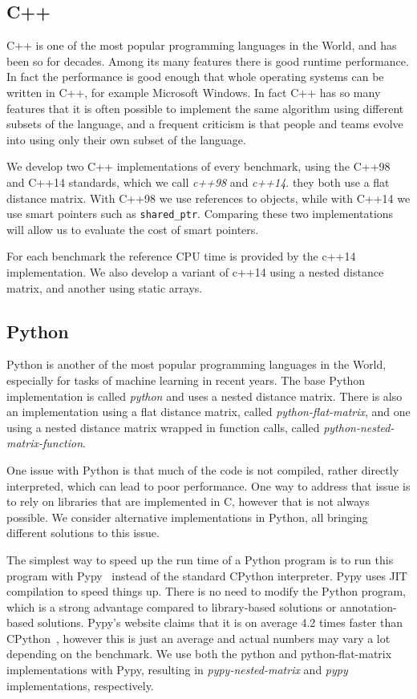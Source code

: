 \documentclass[11pt,a4paper,notitlepage]{article}
\begin{document}
\subsection{C++}
C++ is one of the most popular programming languages in the World, and
has been so for decades. Among its many features there is good
runtime performance. In fact the performance is good enough that whole
operating systems can be written in C++, for example Microsoft
Windows. In fact C++ has so many features that it is often possible to
implement the same algorithm using different subsets of the language,
and a frequent criticism is that people and teams evolve into using
only their own subset of the language.

We develop two C++ implementations of every benchmark, using the C++98
and C++14 standards, which we call \emph{c++98} and \emph{c++14}. they
both use a flat distance matrix. With C++98 we use references to
objects, while with C++14 we use smart pointers such as
\verb|shared_ptr|. Comparing these two implementations will allow us
to evaluate the cost of smart pointers.

For each benchmark the reference CPU time is provided by the c++14
implementation. We also develop a variant of c++14 using a nested
distance matrix, and another using static arrays.

\subsection{Python}
Python is another of the most popular programming languages in the
World, especially for tasks of machine learning in recent years. The
base Python implementation is called \emph{python} and uses a nested
distance matrix. There is also an implementation using a flat distance
matrix, called \emph{python-flat-matrix}, and one using a nested
distance matrix wrapped in function calls, called
\emph{python-nested-matrix-function}.

One issue with Python is that much of the code is not compiled, rather
directly interpreted, which can lead to poor performance. One way to
address that issue is to rely on libraries that are implemented in C,
however that is not always possible. We consider alternative
implementations in Python, all bringing different solutions to this
issue.

The simplest way to speed up the run time of a Python program is
to run this program with Pypy~\cite{pypy} instead of the
standard CPython interpreter. Pypy uses JIT compilation to speed
things up. There is no need to modify the Python program, which is a
strong advantage compared to library-based solutions or
annotation-based solutions. Pypy's website claims that it is on
average 4.2 times faster than CPython~\cite{pypy}, however this is
just an average and actual numbers may vary a lot depending on the
benchmark. We use both the python and python-flat-matrix
implementations with Pypy, resulting in \emph{pypy-nested-matrix} and
\emph{pypy} implementations, respectively.
\end{document}
